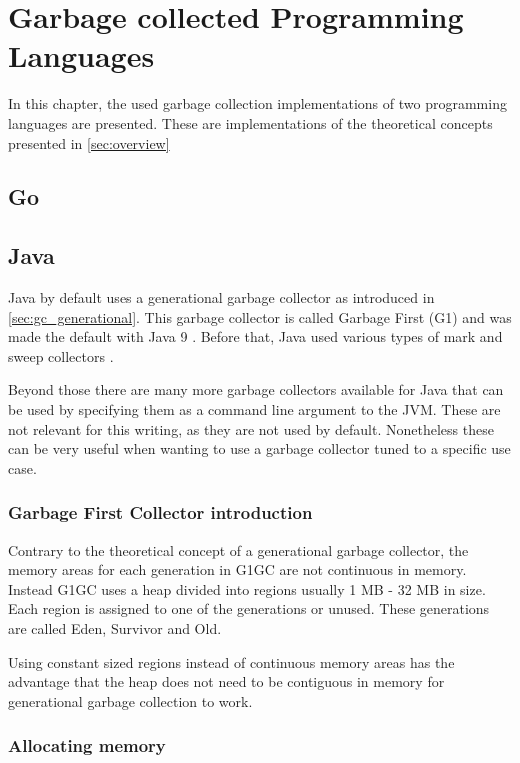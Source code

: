 \chapter{Garbage collected Programming Languages}

In this chapter, the used garbage collection implementations of two programming
languages are presented. These are implementations of the theoretical concepts
presented in \autoref{sec:overview}

\section{Go}
\section{Java}

Java by default uses a generational garbage collector as introduced in \autoref{sec:gc_generational}.
This garbage collector is called Garbage First (G1) and was made the default with Java 9 \cite{java_gc_comparison_2018}.
Before that, Java used various types of mark and sweep collectors \cite{java_available_gcs}.

Beyond those there are many more garbage collectors available for Java that can
be used by specifying them as a command line argument to the JVM.
These are not relevant for this writing, as they are not used by default.
Nonetheless these can be very useful when wanting to use a garbage collector
tuned to a specific use case.

\subsection{Garbage First Collector introduction}

Contrary to the theoretical concept of a generational garbage collector,
the memory areas for each generation in G1GC are not continuous in memory.
Instead G1GC uses a heap divided into regions usually 1 MB - 32 MB in size.
Each region is assigned to one of the generations or unused.
These generations are called Eden, Survivor and Old. \cite{java_g1_getting_started}

Using constant sized regions instead of continuous memory areas has the advantage
that the heap does not need to be contiguous in memory for generational garbage collection to work.

\subsection{Allocating memory}

